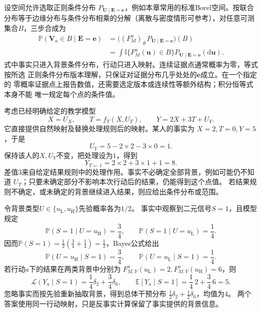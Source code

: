 设空间允许选取正则条件分布
\(P_{\bm U\mid\bm E=\bm e}\)，例如本章常用的标准Borel空间。按联合分布等于边缘分布与条件分布相乘的分解（离散与密度情形可参考），对任意可测集合\(B\)，三步合成为
\begin{equation}
  \begin{aligned}
    \mathbb P(\bm V_a\in B\mid\bm E=\bm e)
    &=
    \bigl((F_M^a)_{\#}
      P_{\bm U\mid\bm E=\bm e}\bigr)(B)\\
    &=
    \int\mathbb I\{F_M^a(\bm u)\in B\}
      P_{\bm U\mid\bm E=\bm e}(\mathrm d\bm u).
  \end{aligned}
  \label{eq:causal-counterfactual-pushforward}
\end{equation}
式中事实只进入背景条件分布，行动只进入映射。连续证据点通常概率为零，等式按所选
正则条件分布版本理解，只保证对证据分布几乎处处的\(\bm e\)成立。在一个指定的
零概率证据点上报告数值，还需要选定版本或连续性等额外结构；积分恒等式本身不能
唯一规定每个点的条件值。

考虑已经明确给定的教学模型
\begin{equation}
  X=U_X,\qquad
  T=f_T(X,U_T),\qquad
  Y=2X+3T+U_Y.
  \label{eq:causal-counterfactual-linear-example}
\end{equation}
它直接提供自然映射及替换处理规则后的映射。某人的事实为
\(X=2,T=0,Y=5\)，于是
\[
  U_Y=5-2\times2-3\times0=1.
\]
保持该人的\(X,U_Y\)不变，把处理设为\(1\)，得到
\[
  Y_{T\leftarrow1}=2\times2+3\times1+1=8.
\]
差值\(3\)来自给定结果规则中的处理作用。事实不必确定全部背景，例如可能仍不知道
\(U_T\)；只要未确定部分不影响本次行动后的结果，仍能得到这个点值。
若结果规则不确定，或未确定的背景继续进入结果，则应给出条件分布或范围。

\begin{example}[两点背景后验的反事实推前]
  \label{ex:causal-two-point-background-posterior}
  令背景类型\(U\in\{u_{\mathrm L},u_{\mathrm H}\}\)先验概率各为\(1/2\)。
  事实中观察到二元信号\(S=1\)，且模型规定
  \[
    \mathbb P(S=1\mid U=u_{\mathrm H})=\frac34,\qquad
    \mathbb P(S=1\mid U=u_{\mathrm L})=\frac14.
  \]
  因而\(\mathbb P(S=1)=\frac12(\frac34+\frac14)=\frac12\)，Bayes公式给出
  \[
    \mathbb P(U=u_{\mathrm H}\mid S=1)=\frac34,\qquad
    \mathbb P(U=u_{\mathrm L}\mid S=1)=\frac14.
  \]
  若行动\(a\)下的结果在两类背景中分别为
  \(F_{M,Y}^a(u_{\mathrm L})=2,F_{M,Y}^a(u_{\mathrm H})=6\)，则
  \[
    \mathcal L(Y_a\mid S=1)=\frac14\delta_2+\frac34\delta_6,\qquad
    \mathbb E[Y_a\mid S=1]=\frac14\,2+\frac34\,6=5.
  \]
  忽略事实而按先验重新抽取背景，得到总体干预分布
  \(\frac12\delta_2+\frac12\delta_6\)，均值为\(4\)。
  两个答案使用同一行动映射，只是反事实计算保留了事实提供的背景信息。
\end{example}

